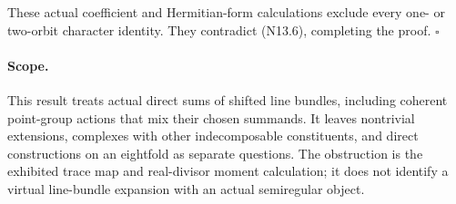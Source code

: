 These actual coefficient and Hermitian-form calculations
exclude every one- or two-orbit character identity. They
contradict (N13.6), completing the proof. \hfill$\square$

\paragraph{Scope.}
This result treats actual direct sums of shifted line bundles,
including coherent point-group actions that mix their chosen
summands. It leaves nontrivial extensions, complexes with other
indecomposable constituents, and direct constructions on an
eightfold as separate questions. The obstruction is the exhibited
trace map and real-divisor moment calculation; it does not
identify a virtual line-bundle expansion with an actual
semiregular object.
